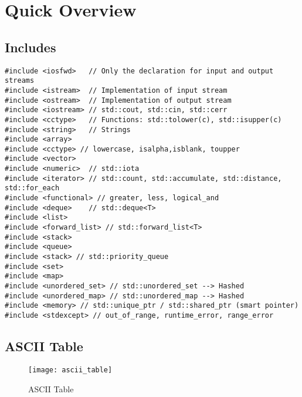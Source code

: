 \section{Quick Overview}

\subsection{Includes}

\begin{lstlisting}
#include <iosfwd> 	// Only the declaration for input and output streams
#include <istream>  // Implementation of input stream
#include <ostream>  // Implementation of output stream
#include <iostream> // std::cout, std::cin, std::cerr
#include <cctype>   // Functions: std::tolower(c), std::isupper(c)
#include <string>   // Strings
#include <array>
#include <cctype> // lowercase, isalpha,isblank, toupper
#include <vector>
#include <numeric>  // std::iota
#include <iterator> // std::count, std::accumulate, std::distance, std::for_each
#include <functional> // greater, less, logical_and
#include <deque>    // std::deque<T>
#include <list>
#include <forward_list> // std::forward_list<T>
#include <stack>
#include <queue>
#include <stack> // std::priority_queue
#include <set>
#include <map>
#include <unordered_set> // std::unordered_set --> Hashed
#include <unordered_map> // std::unordered_map --> Hashed
#include <memory> // std::unique_ptr / std::shared_ptr (smart pointer)
#include <stdexcept> // out_of_range, runtime_error, range_error
\end{lstlisting}

\pagebreak

\subsection{ASCII Table}
\begin{figure}[h!]
  \center
  \texttt{[image: ascii\_table]}
  \caption{ASCII Table}
\end{figure}

\pagebreak

